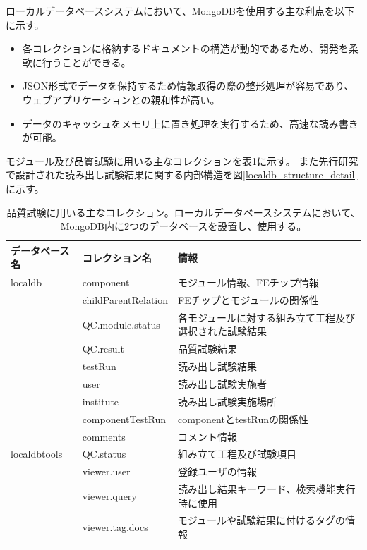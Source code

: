 ローカルデータベースシステムにおいて、MongoDBを使用する主な利点を以下に示す。

\begin{itemize}
  \item 各コレクションに格納するドキュメントの構造が動的であるため、開発を柔軟に行うことができる。
  \item JSON形式でデータを保持するため情報取得の際の整形処理が容易であり、ウェブアプリケーションとの親和性が高い。
  \item データのキャッシュをメモリ上に置き処理を実行するため、高速な読み書きが可能。
\end{itemize}

モジュール及び品質試験に用いる主なコレクションを表\ref{localdb_structure}に示す。
また先行研究で設計された読み出し試験結果に関する内部構造を図\ref{localdb_structure_detail}に示す。

\begin{table}[btp]
\begin{center}
\caption[品質試験に用いる主なコレクション]{品質試験に用いる主なコレクション。ローカルデータベースシステムにおいて、MongoDB内に2つのデータベースを設置し、使用する。}
\label{localdb_structure}
  \small
  \begin{tabular}{|lll|} \hline
    データベース名 & コレクション名 & 情報 \\ \hline
    localdb      & component & モジュール情報、FEチップ情報 \\ 
                 & childParentRelation & FEチップとモジュールの関係性 \\ 
                 & QC.module.status & 各モジュールに対する組み立て工程及び選択された試験結果 \\ 
                 & QC.result & 品質試験結果 \\ 
                 & testRun & 読み出し試験結果 \\ 
                 & user & 読み出し試験実施者 \\
                 & institute & 読み出し試験実施場所 \\
                 & componentTestRun & componentとtestRunの関係性 \\
                 & comments & コメント情報 \\ \hline
    localdbtools & QC.status & 組み立て工程及び試験項目\\
                 & viewer.user & 登録ユーザの情報 \\
                 & viewer.query & 読み出し結果キーワード、検索機能実行時に使用 \\ 
                 & viewer.tag.docs & モジュールや試験結果に付けるタグの情報 \\ \hline
  \end{tabular}
\end{center}
\end{table}

